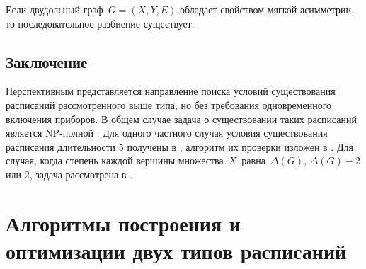 \begin{theorem}\label{the05}
Если двудольный граф\ $G=(X,Y,E)$ обладает свойством мягкой асимметрии, то последовательное разбиение существует.
\end{theorem}
\section{ Заключение}
Перспективным представляется направление поиска условий существования расписаний рассмотренного выше типа, но без требования одновременного включения приборов. В общем случае задача о существовании таких расписаний является NP-полной \cite{akm-6}.  Для одного частного случая условия существования расписания длительности 5 получены в \cite{akm-7}, алгоритм их проверки изложен в \cite{akm-8}.  Для случая, когда степень каждой вершины множества\ $X$\ равна\ $\Delta(G)$, $\Delta(G)-2$ или 2, задача рассмотрена в \cite{akm-9}.
\par\medskip



\chapter{Алгоритмы построения и оптимизации двух типов расписаний}\label{akm2}
